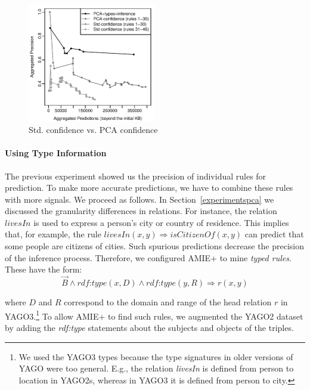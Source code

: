 \begin{figure}
\includegraphics[width=0.5\textwidth]{figures/std_vs_pca}
\caption{Std. confidence vs. PCA confidence}
\label{finalshow}
\end{figure}

\paragraph{Using Type Information}
The previous experiment showed us the precision of individual rules for prediction.
To make more accurate predictions, we have to combine these rules with more signals.
We proceed as follows. In Section~\ref{experimentspca} we discussed the granularity
differences in relations. For instance, the relation $livesIn$ is used to express a person's city or country of residence.
This implies that, for example, the rule
$livesIn(x, y) \Rightarrow isCitizenOf(x, y)$ can predict that some people are citizens of cities. Such spurious predictions decrease the precision
of the inference process. Therefore, we configured AMIE+ to mine \emph{typed rules}. These have the form:
\[
 \vec{B} \wedge \textit{rdf:type}(x, D) \wedge \textit{rdf:type}(y, R) \Rightarrow r(x, y)
\]

\noindent where $D$ and $R$ correspond to the domain and range of the head relation $r$ in YAGO3.\footnote{We used the YAGO3 \cite{yago3} types because the type signatures in older versions of YAGO were too general. E.g., the relation \emph{livesIn} is defined
from person to location in YAGO2s, whereas in YAGO3 it is defined from person to city.} To allow AMIE+ to find such rules, we augmented the YAGO2 dataset by adding the \emph{rdf:type} statements about the subjects and objects of the triples.

